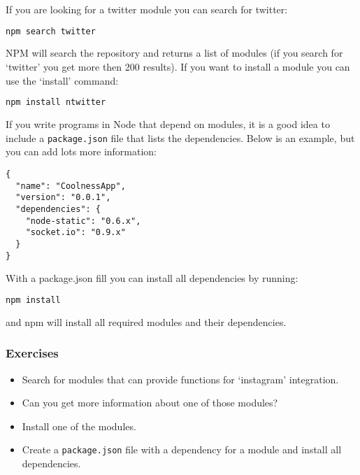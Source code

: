 \documentclass[a4paper]{report}
\begin{document}
If you are looking for a twitter module you can search for twitter: 
\begin{lstlisting}[language=bash] 
npm search twitter 
\end{lstlisting} 
NPM will search the repository and returns a list of modules (if you search for `twitter' you get more then 200 results). If you want to install a module you can use the `install' command: 
\begin{lstlisting}[language=bash] 
npm install ntwitter 
\end{lstlisting} 
If you write programs in Node that depend on modules, it is a good idea to include a \texttt{package.json} file that lists the dependencies. Below is an example, but you can add lots more information: 
\begin{lstlisting} 
{ 
  "name": "CoolnessApp", 
  "version": "0.0.1", 
  "dependencies": { 
    "node-static": "0.6.x", 
    "socket.io": "0.9.x" 
  } 
} 
\end{lstlisting} 
 
\noindent With a package.json fill you can install all dependencies by running: 
\begin{lstlisting}[language=bash] 
npm install 
\end{lstlisting} 
\noindent and npm will install all required modules and their dependencies. 
 
\subsubsection*{Exercises} 
\begin{itemize} 
	\item Search for modules that can provide functions for `instagram' integration. 
	\item Can you get more information about one of those modules? 
	\item Install one of the modules. 
	\item Create a \texttt{package.json} file with a dependency for a module and install all dependencies. 
\end{itemize} 
 
\end{document}

